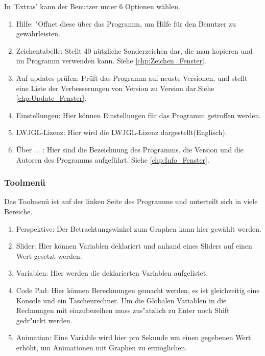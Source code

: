 \documentclass{scrartcl}
\begin{document}
In 'Extras' kann der Benutzer unter 6 Optionen w\"ahlen.
\begin{enumerate}
 \item Hilfe: "Offnet diese \"uber das Programm, um Hilfe f\"ur den Benutzer zu gew\"ahrleisten.
 \item Zeichentabelle: Stellt 40 n\"utzliche Sonderzeichen dar, die man kopieren und im Programm verwenden kann. Siehe  \ref{chp:Zeichen_Fenster}.
 \item Auf updates pr\"ufen: Pr\"uft das Programm auf neuste Versionen, und stellt eine Liste der Verbesserungen von Version zu Version dar.Siehe  \ref{chp:Update_Fenster}.
 \item Einstellungen: Hier k\"onnen Einstellungen f\"ur das Programm getroffen werden.
 \item LWJGL-Lizenz: Hier wird die LWJGL-Lizenz dargestellt(Englisch).
 \item \"Uber ... : Hier sind die Bezeichnung des Programms, die Version und die Autoren des Programms aufgef\"uhrt. Siehe  \ref{chp:Info_Fenster}.
\end{enumerate}

\subsubsection{Toolmen\"u}
Das Toolmen\"u ist auf der linken Seite des Programms und unterteilt sich in viele Bereiche.
\begin{enumerate}
 \item Perspektive: Der Betrachtungswinkel zum Graphen kann hier gew\"ahlt werden.
 \item Slider: Hier k\"onnen Variablen deklariert und anhand eines Sliders auf einen Wert gesetzt werden.
 \item Variablen: Hier werden die deklarierten Variablen aufgelistet.
 \item Code Pad: Hier k\"onnen Berechnungen gemacht werden, es ist gleichzeitig eine Konsole und ein Taschenrechner. Um die Globalen Variablen in die Rechnungen mit einzubezeihen muss zus"atzlich zu Enter noch Shift gedr"uckt werden.
 \item Animation: Eine Variable wird hier pro Sekunde um einen gegebenen Wert erh\"oht, um Animationen mit Graphen zu erm\"oglichen.
\end{enumerate}
\end{document}
